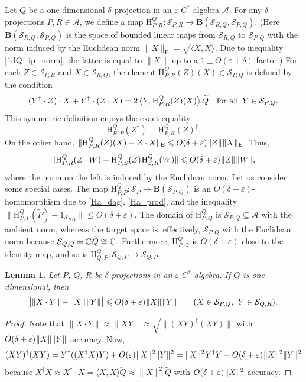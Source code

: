 \documentclass[12pt]{article}
\newcommand{\CC}{\mathbb{C}}
\newcommand{\calA}{\mathcal{A}}
\newcommand{\calS}{\mathcal{S}}
\newcommand{\ts}{\mkern1mu}
\newcommand{\Bo}{\mathbf{B}}
\newcommand{\Ha}{\mathrm{H}}
\newcommand{\Euc}{\mathrm{E}}
\newcommand{\wt}{\widetilde}
\newcommand{\blangle}{\bigl\langle}
\newcommand{\brangle}{\bigr\rangle}
\newcommand*{\braket}[2]{\langle{#1},{#2}\rangle}
\newcommand*{\bbraket}[2]{\blangle{#1},\mkern1mu{#2}\brangle}
\newcommand{\eps}{\varepsilon}
\renewcommand{\le}{\leqslant}
\newtheorem{Lemma}[Theorem]{Lemma}
\newtheorem[definition]{Definition}[Theorem]{Definition}
\newtheorem[remark]{Example}[Theorem]{Example}
\newtheorem[remark]{Remark}[Theorem]{Remark}
\newtheorem[remark]{Question}[Theorem]{Open question}
\newtheorem*[definition]{definition}{Definition}
\newtheorem*[remark]{example}{Example}
\newtheorem*[remark]{remark}{Remark}
\newtheorem*[remark]{question}{Open question}
\numberwithin{equation}{section}
\begin{document}
Let $Q$ be a one-dimensional $\delta$-projection in an $\eps$-$C^*$ algebra $\calA$. For any $\delta$-projections $P,R\in\calA$, we define a map $\Ha^{Q}_{P,R}\colon\calS_{P,R}\to\Bo(\calS_{R,Q},\calS_{P,Q})$. (Here $\Bo(\calS_{R,Q},\calS_{P,Q})$ is the space of bounded linear maps from $\calS_{R,Q}$ to $\calS_{P,Q}$ with the norm induced by the Euclidean norm $\|X\|_\Euc=\sqrt{\braket{X}{X}}$. Due to inequality \eqref{1dQ_ip_norm}, the latter is equal to $\|X\|$ up to a $1\pm O(\eps+\delta)$ factor.) For each $Z\in\calS_{P,R}$ and $X\in\calS_{R,Q}$, the element $\Ha^{Q}_{P,R}(Z)(X)\in\calS_{P,Q}$ is defined by the condition
\begin{equation}\label{Ha_def}
(Y^\dag\cdot Z)\cdot X+Y^\dag\cdot(Z\cdot X)
=2\,\bbraket{Y}{\Ha^{Q}_{P,R}(Z)(X)}\,\wt{Q}\quad \text{for all }\,Y\in\calS_{P,Q}.
\end{equation}
This symmetric definition enjoys the exact equality
\begin{equation}\label{Ha_dag}
\Ha^{Q}_{R,P}(Z^\dag)=\Ha^{Q}_{P,R}(Z)^\dag.
\end{equation}
On the other hand, $\|\Ha^{Q}_{P,R}(Z)(X)-Z\cdot X\|_\Euc\le O(\delta+\eps)\ts\|Z\|\ts\|X\|_\Euc$. Thus,
\begin{equation}\label{Ha_prod}
\|\Ha^{Q}_{P,R}(Z\cdot W)-\Ha^{Q}_{P,S}(Z)\ts\Ha^{Q}_{S,R}(W)\|
\le O(\delta+\eps)\ts\|Z\|\ts\|W\|,
\end{equation}
where the norm on the left is induced by the Euclidean norm. Let us consider some special cases. The map $\Ha^{Q}_{P,P}\colon\calS_{P}\to\Bo(\calS_{P,Q})$ is an $O(\delta+\eps)$-homomorphism due to \eqref{Ha_dag}, \eqref{Ha_prod}, and the inequality $\|\Ha^{Q}_{P,P}(\wt{P})-1_{\calS_{P,Q}}\|\le O(\delta+\eps)$. The domain of $\Ha^{Q}_{P,Q}$ is $\calS_{P,Q}\subseteq\calA$ with the ambient norm, whereas the target space is, effectively, $\calS_{P,Q}$ with the Euclidean norm because $\calS_{Q,Q}=\CC\ts\wt{Q}\cong\CC$. Furthermore, $\Ha^{Q}_{P,Q}$ is $O(\delta+\eps)$-close to the identity map, and so is $\Ha^{Q}_{Q,P}\colon\calS_{Q,P}\to\calS_{Q,P}$.

\begin{Lemma}\label{lem_PQR}
Let $P$, $Q$, $R$ be $\delta$-projections in an $\eps$-$C^*$ algebra. If $Q$ is one-dimensional, then
\[
\bigl|\|X\cdot Y\|-\|X\|\ts\|Y\|\bigr|\le O(\delta+\eps)\ts\|X\|\ts\|Y\|\qquad
(X\in\calS_{P,Q},\:\, Y\in\calS_{Q,R}).
\]
\end{Lemma}

\begin{proof}
Note that $\|X\cdot Y\|\approx\|XY\|\approx\sqrt{\|(XY)^{\dag}(XY)\|}$ with $O(\delta+\eps)\ts\|X\|\|Y\|$ accuracy. Now,
\[
(XY)^{\dag}(XY)=Y^\dag((X^{\dag}X)Y)+O(\eps)\ts\|X\|^2\|Y\|^2
=\|X\|^2\ts Y^{\dag}Y+O(\delta+\eps)\ts\|X\|^2\|Y\|^2
\]
because $X^{\dag}X\approx X^\dag\cdot X =\braket{X}{X}\wt{Q}\approx \|X\|^2\wt{Q}$ with $O(\delta+\eps)\ts\|X\|^2$ accuracy.
\end{proof}
\end{document}
